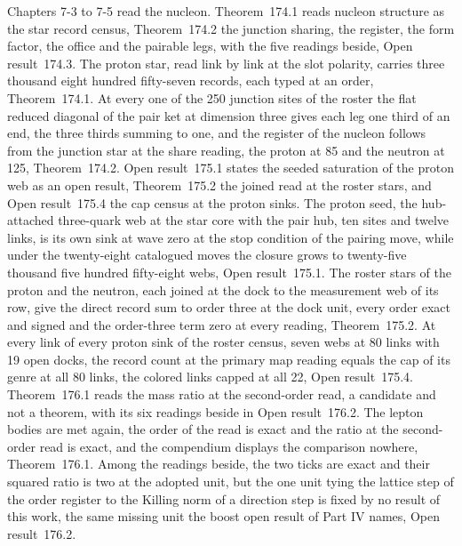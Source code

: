 Chapters 7-3 to 7-5 read the nucleon. Theorem~174.1 reads nucleon structure as the star record census, Theorem~174.2 the junction sharing, the register, the form factor, the office and the pairable legs, with the five readings beside, Open result~174.3. The proton star, read link by link at the slot polarity, carries three thousand eight hundred fifty-seven records, each typed at an order, Theorem~174.1. At every one of the 250 junction sites of the roster the flat reduced diagonal of the pair ket at dimension three gives each leg one third of an end, the three thirds summing to one, and the register of the nucleon follows from the junction star at the share reading, the proton at 85 and the neutron at 125, Theorem~174.2. Open result~175.1 states the seeded saturation of the proton web as an open result, Theorem~175.2 the joined read at the roster stars, and Open result~175.4 the cap census at the proton sinks. The proton seed, the hub-attached three-quark web at the star core with the pair hub, ten sites and twelve links, is its own sink at wave zero at the stop condition of the pairing move, while under the twenty-eight catalogued moves the closure grows to twenty-five thousand five hundred fifty-eight webs, Open result~175.1. The roster stars of the proton and the neutron, each joined at the dock to the measurement web of its row, give the direct record sum to order three at the dock unit, every order exact and signed and the order-three term zero at every reading, Theorem~175.2. At every link of every proton sink of the roster census, seven webs at 80 links with 19 open docks, the record count at the primary map reading equals the cap of its genre at all 80 links, the colored links capped at all 22, Open result~175.4. Theorem~176.1 reads the mass ratio at the second-order read, a candidate and not a theorem, with its six readings beside in Open result~176.2. The lepton bodies are met again, the order of the read is exact and the ratio at the second-order read is exact, and the compendium displays the comparison nowhere, Theorem~176.1. Among the readings beside, the two ticks are exact and their squared ratio is two at the adopted unit, but the one unit tying the lattice step of the order register to the Killing norm of a direction step is fixed by no result of this work, the same missing unit the boost open result of Part IV names, Open result~176.2.

